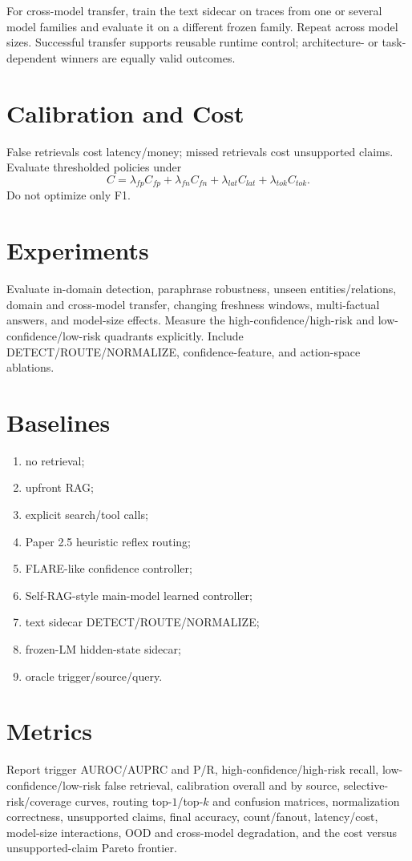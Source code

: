 \documentclass[11pt]{article}
\begin{document}
For cross-model transfer, train the text sidecar on traces from one or several
model families and evaluate it on a different frozen family. Repeat across model
sizes. Successful transfer supports reusable runtime control; architecture- or
task-dependent winners are equally valid outcomes.

\section{Calibration and Cost}
False retrievals cost latency/money; missed retrievals cost unsupported claims. Evaluate thresholded policies under
\[
C=\lambda_{fp}C_{fp}+\lambda_{fn}C_{fn}+\lambda_{lat}C_{lat}+\lambda_{tok}C_{tok}.
\]
Do not optimize only F1.

\section{Experiments}
Evaluate in-domain detection, paraphrase robustness, unseen entities/relations,
domain and cross-model transfer, changing freshness windows, multi-factual
answers, and model-size effects. Measure the high-confidence/high-risk and
low-confidence/low-risk quadrants explicitly. Include DETECT/ROUTE/NORMALIZE,
confidence-feature, and action-space ablations.

\section{Baselines}
\begin{enumerate}
\item no retrieval;
\item upfront RAG;
\item explicit search/tool calls;
\item Paper 2.5 heuristic reflex routing;
\item FLARE-like confidence controller;
\item Self-RAG-style main-model learned controller;
\item text sidecar DETECT/ROUTE/NORMALIZE;
\item frozen-LM hidden-state sidecar;
\item oracle trigger/source/query.
\end{enumerate}

\section{Metrics}
Report trigger AUROC/AUPRC and P/R, high-confidence/high-risk recall,
low-confidence/low-risk false retrieval, calibration overall and by source,
selective-risk/coverage curves, routing top-$1$/top-$k$ and confusion matrices,
normalization correctness, unsupported claims, final accuracy, count/fanout,
latency/cost, model-size interactions, OOD and cross-model degradation, and the
cost versus unsupported-claim Pareto frontier.
\end{document}
